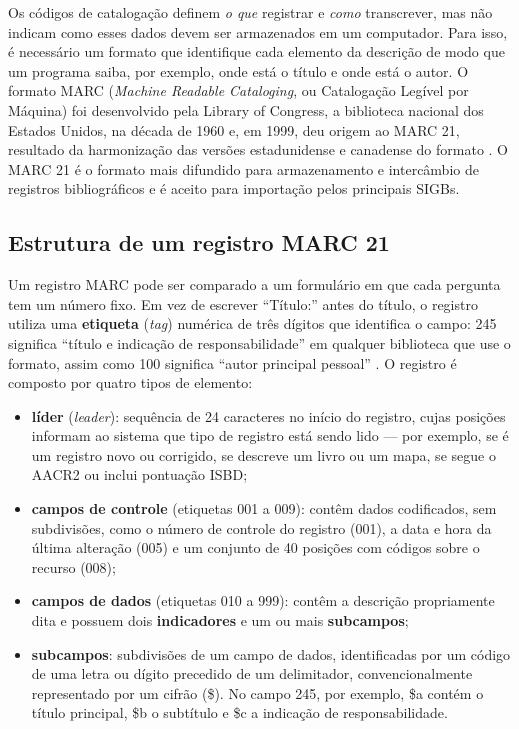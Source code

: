 Os códigos de catalogação definem \emph{o que} registrar e \emph{como} transcrever, mas não indicam como esses dados devem ser armazenados em um computador. Para isso, é necessário um formato que identifique cada elemento da descrição de modo que um programa saiba, por exemplo, onde está o título e onde está o autor. O formato MARC (\textit{Machine Readable Cataloging}, ou Catalogação Legível por Máquina) foi desenvolvido pela Library of Congress, a biblioteca nacional dos Estados Unidos, na década de 1960 e, em 1999, deu origem ao MARC 21, resultado da harmonização das versões estadunidense e canadense do formato \cite{loc2023}. O MARC 21 é o formato mais difundido para armazenamento e intercâmbio de registros bibliográficos e é aceito para importação pelos principais SIGBs.

\subsection{Estrutura de um registro MARC 21}
\label{subsec:marc-estrutura}

Um registro MARC pode ser comparado a um formulário em que cada pergunta tem um número fixo. Em vez de escrever ``Título:'' antes do título, o registro utiliza uma \textbf{etiqueta} (\textit{tag}) numérica de três dígitos que identifica o campo: 245 significa ``título e indicação de responsabilidade'' em qualquer biblioteca que use o formato, assim como 100 significa ``autor principal pessoal'' \cite{furrie2009}. O registro é composto por quatro tipos de elemento:

\begin{itemize}
    \item \textbf{líder} (\textit{leader}): sequência de 24 caracteres no início do registro, cujas posições informam ao sistema que tipo de registro está sendo lido --- por exemplo, se é um registro novo ou corrigido, se descreve um livro ou um mapa, se segue o AACR2 ou inclui pontuação ISBD;
    \item \textbf{campos de controle} (etiquetas 001 a 009): contêm dados codificados, sem subdivisões, como o número de controle do registro (001), a data e hora da última alteração (005) e um conjunto de 40 posições com códigos sobre o recurso (008);
    \item \textbf{campos de dados} (etiquetas 010 a 999): contêm a descrição propriamente dita e possuem dois \textbf{indicadores} e um ou mais \textbf{subcampos};
    \item \textbf{subcampos}: subdivisões de um campo de dados, identificadas por um código de uma letra ou dígito precedido de um delimitador, convencionalmente representado por um cifrão (\$). No campo 245, por exemplo, \$a contém o título principal, \$b o subtítulo e \$c a indicação de responsabilidade.
\end{itemize}

